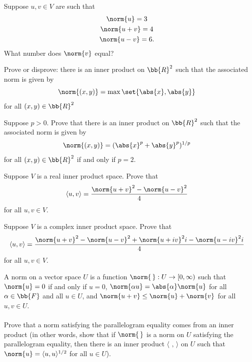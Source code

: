 \documentclass[12pt,letterpaper]{hmcpset}
\begin{document}
\begin{problem}[16]
	Suppose $u, v \in V$ are such that
	\[
		\begin{gathered}
			\norm{u} = 3 \\
			\norm{u + v} = 4 \\
			\norm{u - v} = 6.
		\end{gathered}
	\]
	What number does $\norm{v}$ equal?
\end{problem}

\begin{problem}[17]
	Prove or disprove: there is an inner product on $\bb{R}^2$ such that the associated norm is given by
	\[
		\norm{(x, y)} = \max \set{\abs{x}, \abs{y}}
	\]
	for all $(x, y) \in  \bb{R}^2$
\end{problem}

\begin{problem}[18]
	Suppose $p > 0$. Prove that there is an inner product on $\bb{R}^2$ such that the associated norm is given by
	\[
		\norm{(x, y)} = (\abs{x}^p + \abs{y}^p)^{1/p}
	\]
	for all $(x, y) \in \bb{R}^2$ if and only if $p = 2$.
\end{problem}

\begin{problem}[19]
	Suppose $V$ is a real inner product space. Prove that
	\[
		\langle u, v \rangle = \frac{\norm{u + v}^2 - \norm{u - v}^2}{4}	
	\]
	for all $u, v \in V$.
\end{problem}

\begin{problem}[20]
	Suppose $V$ is a complex inner product space. Prove that
	\[
		\langle u, v \rangle = \frac{\norm{u + v}^2 - \norm{u - v}^2 + \norm{u + i v}^2 i - \norm{u - i v}^2 i}{4}	
	\]
	for all $u, v \in V$.
\end{problem}

\begin{problem}[21]
	A norm on a vector space $U$ is a function $\norm{\,}: U \to [0, \infty)$ such that $\norm{u} = 0$ if and only if $u = 0$, $\norm{\alpha u} = \abs{\alpha} \norm{u}$ for all $\alpha \in \bb{F}$ and all $u \in U$, and $\norm{u + v} \le \norm{u} + \norm{v}$ for all $u, v \in U$. \\\\
	Prove that a norm satisfying the parallelogram equality comes from an inner product (in other words, show that if $\norm{\,}$ is a norm on $U$ satisfying the parallelogram equality, then there is an inner product $\langle \,\, , \, \rangle$ on $U$ such that $\norm{u} = \langle u, u \rangle^{1/2}$ for all $u \in U$).
\end{problem}
\end{document}

